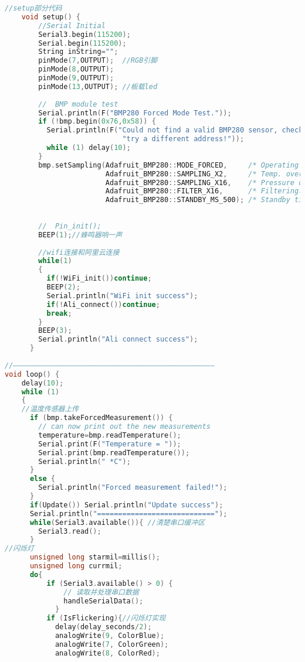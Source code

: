 \documentclass[12pt,hyperref,a4paper,UTF8]{ctexart}
\begin{document}
\begin{lstlisting}[language=C++]
//setup部分代码
    void setup() {
        //Serial Initial
        Serial3.begin(115200);
        Serial.begin(115200);
        String inString="";
        pinMode(7,OUTPUT);  //RGB引脚
        pinMode(8,OUTPUT); 
        pinMode(9,OUTPUT); 
        pinMode(13,OUTPUT); //板载led
        
        //  BMP module test
        Serial.println(F("BMP280 Forced Mode Test."));
        if (!bmp.begin(0x76,0x58)) {
          Serial.println(F("Could not find a valid BMP280 sensor, check wiring or "
                            "try a different address!"));
          while (1) delay(10);
        }
        bmp.setSampling(Adafruit_BMP280::MODE_FORCED,     /* Operating Mode. */
                        Adafruit_BMP280::SAMPLING_X2,     /* Temp. oversampling */
                        Adafruit_BMP280::SAMPLING_X16,    /* Pressure oversampling */
                        Adafruit_BMP280::FILTER_X16,      /* Filtering. */
                        Adafruit_BMP280::STANDBY_MS_500); /* Standby time. */
      
        
        //  Pin_init();
        BEEP(1);//蜂鸣器响一声
        
        //wifi连接和阿里云连接
        while(1)
        {
          if(!WiFi_init())continue;
          BEEP(2);
          Serial.println("WiFi init success");
          if(!Ali_connect())continue;
          break;
        }
        BEEP(3);
        Serial.println("Ali connect success");
      }
      
//————————————————————————————————————————————————
void loop() {
    delay(10);
    while (1)
    {
    //温度传感器上传
      if (bmp.takeForcedMeasurement()) {
        // can now print out the new measurements
        temperature=bmp.readTemperature();
        Serial.print(F("Temperature = "));
        Serial.print(bmp.readTemperature());
        Serial.println(" *C");
      }
      else {
        Serial.println("Forced measurement failed!");
      }
      if(Update()) Serial.println("Update success");
      Serial.println("============================");
      while(Serial3.available()){ //清楚串口缓冲区
        Serial3.read();
      }
//闪烁灯
      unsigned long starmil=millis();
      unsigned long currmil;
      do{
          if (Serial3.available() > 0) {
              // 读取并处理串口数据
              handleSerialData();
            }
          if (IsFlickering){//闪烁灯实现
            delay(delay_seconds/2);
            analogWrite(9, ColorBlue);
            analogWrite(7, ColorGreen);
            analogWrite(8, ColorRed);


\end{lstlisting}
\end{document}
